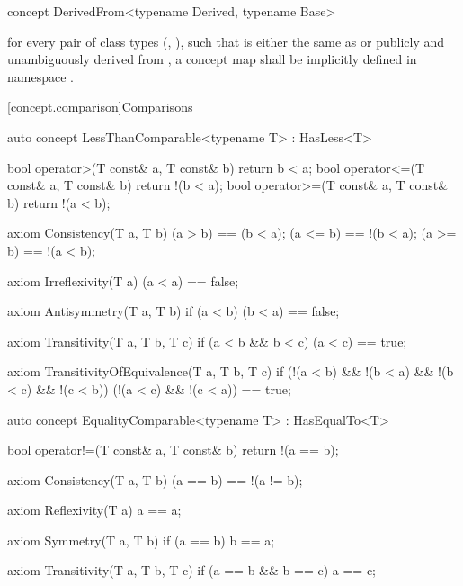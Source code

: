 \documentclass[american,twoside]{book}
\begin{document}
\begin{itemdecl}
concept DerivedFrom<typename Derived, typename Base> { }
\end{itemdecl}

\begin{itemdescr}
\pnum
\mbox{\requires}
for every pair of class types (\mbox{}, \mbox{}),
such that \mbox{} is either the same as or publicly and
unambiguously derived from \mbox{}, a concept map
\mbox{} shall be implicitly defined in namespace
\mbox{}.
\end{itemdescr}

[concept.comparison]{Comparisons}
\begin{itemdecl}
auto concept LessThanComparable<typename T> : HasLess<T> {
  bool operator>(T const& a, T const& b) { return b < a; }
  bool operator<=(T const& a, T const& b) { return !(b < a); }
  bool operator>=(T const& a, T const& b) { return !(a < b); }

  axiom Consistency(T a, T b) {
    (a > b) == (b < a);
    (a <= b) == !(b < a);
    (a >= b) == !(a < b);
  }

  axiom Irreflexivity(T a) { (a < a) == false; }

  axiom Antisymmetry(T a, T b) { 
    if (a < b) (b < a) == false;
  }

  axiom Transitivity(T a, T b, T c) {
    if (a < b && b < c) (a < c) == true;
  }

  axiom TransitivityOfEquivalence(T a, T b, T c) {
    if (!(a < b) && !(b < a) && !(b < c) && !(c < b))
      (!(a < c) && !(c < a)) == true;
  } 
}
\end{itemdecl}

\begin{itemdescr}
\pnum 
{}
\end{itemdescr}

\begin{itemdecl}
auto concept EqualityComparable<typename T> : HasEqualTo<T> {
  bool operator!=(T const& a, T const& b) { return !(a == b); }

  axiom Consistency(T a, T b) {
    (a == b) == !(a != b);
  }

  axiom Reflexivity(T a) { a == a; }

  axiom Symmetry(T a, T b) { if (a == b) b == a; }

  axiom Transitivity(T a, T b, T c) {
    if (a == b && b == c) a == c;
  }
}
\end{itemdecl}
\end{document}
